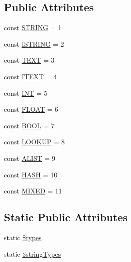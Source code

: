 \subsection*{Public Attributes}
\begin{DoxyCompactItemize}
\item 
const \hyperlink{classHTMLPurifier__VarParser_a44f72ff042eafa191ec51949f33228da}{S\+T\+R\+I\+N\+G} = 1
\item 
const \hyperlink{classHTMLPurifier__VarParser_a1d87ae5b275086cc3359f3347c36173e}{I\+S\+T\+R\+I\+N\+G} = 2
\item 
const \hyperlink{classHTMLPurifier__VarParser_a779fccb6c9d4d94082669d0798d28474}{T\+E\+X\+T} = 3
\item 
const \hyperlink{classHTMLPurifier__VarParser_a6573b18b6e7f5d97f75ceefa074693a3}{I\+T\+E\+X\+T} = 4
\item 
const \hyperlink{classHTMLPurifier__VarParser_af33c9523cd91827a7b94e938df336233}{I\+N\+T} = 5
\item 
const \hyperlink{classHTMLPurifier__VarParser_a92917219071eaffb66dd1b71da0c702e}{F\+L\+O\+A\+T} = 6
\item 
const \hyperlink{classHTMLPurifier__VarParser_ae303e5d8799852e4fdc1bd99603532cf}{B\+O\+O\+L} = 7
\item 
const \hyperlink{classHTMLPurifier__VarParser_a72f3c2600fc72784fbad831239a9b789}{L\+O\+O\+K\+U\+P} = 8
\item 
const \hyperlink{classHTMLPurifier__VarParser_a3903ff9322140086ac0b88034ec67eed}{A\+L\+I\+S\+T} = 9
\item 
const \hyperlink{classHTMLPurifier__VarParser_a525320233f95a8935ef20a228f5e02ea}{H\+A\+S\+H} = 10
\item 
const \hyperlink{classHTMLPurifier__VarParser_a872664f6dd6287737d31a8840e133027}{M\+I\+X\+E\+D} = 11
\end{DoxyCompactItemize}
\subsection*{Static Public Attributes}
\begin{DoxyCompactItemize}
\item 
static \hyperlink{classHTMLPurifier__VarParser_ad68cf831a2223db6a6d144226b52cc09}{\$types}
\item 
static \hyperlink{classHTMLPurifier__VarParser_a4af5b2194b5966db95bbd053a705a047}{\$string\+Types}
\end{DoxyCompactItemize}
